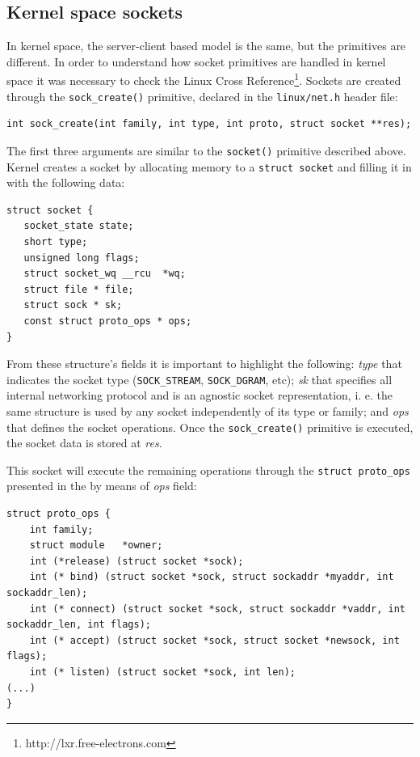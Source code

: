 \subsection{Kernel space sockets}

In kernel space, the server-client based model is the same, but the primitives are different. In order to understand how socket primitives are handled in kernel space it was necessary to check the Linux Cross Reference\footnote{http://lxr.free-electrons.com}. Sockets are created through the \texttt{sock\_create()} primitive, declared in the \texttt{linux/net.h} header file:

\begin{lstlisting}[style=CInputStyle]
int sock_create(int family, int type, int proto, struct socket **res);
\end{lstlisting}

The first three arguments are similar to the \texttt{socket()} primitive described above. Kernel creates a socket by allocating memory to a \texttt{struct socket} and filling it in with the following data:

\begin{lstlisting}[style=CInputStyle]
struct socket {
   socket_state state;
   short type;
   unsigned long flags;
   struct socket_wq __rcu  *wq;
   struct file * file;
   struct sock * sk;
   const struct proto_ops * ops;
}
\end{lstlisting}

From these structure's fields it is important to highlight the following: \textit{type} that indicates the socket type (\texttt{SOCK\_STREAM}, \texttt{SOCK\_DGRAM}, etc); \textit{sk} that specifies all internal networking protocol and is an agnostic socket representation, i. e. the same structure is used by any socket independently of its type or family; and \textit{ops} that defines the socket operations. Once the \texttt{sock\_create()} primitive is executed, the socket data is stored at \textit{res}.

This socket will execute the remaining operations through the \texttt{struct proto\_ops} presented in the  by means of \textit{ops} field:

\begin{lstlisting}[style=CInputStyle]
struct proto_ops {
    int family;
    struct module   *owner;
    int (*release) (struct socket *sock);
    int (* bind) (struct socket *sock, struct sockaddr *myaddr, int sockaddr_len);
    int (* connect) (struct socket *sock, struct sockaddr *vaddr, int sockaddr_len, int flags);
    int (* accept) (struct socket *sock, struct socket *newsock, int flags);
    int (* listen) (struct socket *sock, int len);
(...)
}
\end{lstlisting}


